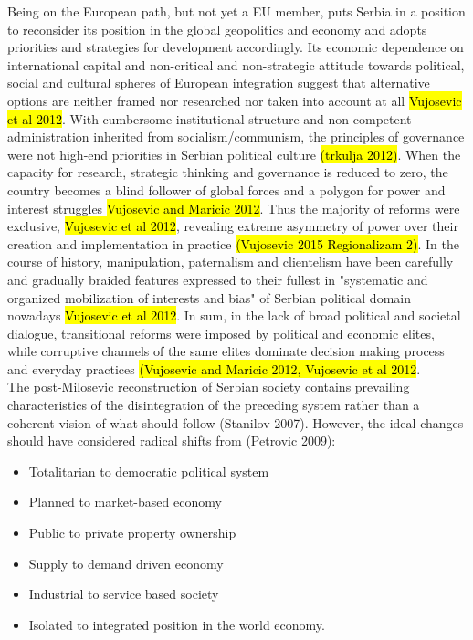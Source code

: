 \documentclass[11pt]{report}
\begin{document}
Being on the European path, but not yet a EU member, puts Serbia in a position to reconsider its position in the global geopolitics and economy and adopts priorities and strategies for development accordingly. Its economic dependence on international capital and non-critical and non-strategic attitude towards political, social and cultural spheres of European integration suggest that alternative options are neither framed nor researched nor taken into account at all \hl{Vujosevic et al 2012}. With cumbersome institutional structure and non-competent administration inherited from socialism/communism, the principles of governance were not high-end priorities in Serbian political culture \hl{(trkulja 2012)}. When the capacity for research, strategic thinking and governance is reduced to zero, the country becomes a blind follower of global forces and a polygon for power and interest struggles \hl{Vujosevic and Maricic 2012}.
Thus the majority of reforms were exclusive, \hl{Vujosevic et al 2012}, revealing extreme asymmetry of power over their creation and implementation in practice \hl{(Vujosevic 2015 Regionalizam 2)}.
In the course of history, manipulation, paternalism and clientelism have been carefully and gradually braided features expressed to their fullest in  "systematic and organized mobilization of interests and bias" of Serbian political domain nowadays \hl{Vujosevic et al 2012}. In sum, in the lack of broad political and societal dialogue, transitional reforms were imposed by political and economic elites, while corruptive channels of the same elites dominate decision making process and everyday practices \hl{(Vujosevic and Maricic 2012, Vujosevic et al 2012}. 
\\
The post-Milosevic reconstruction of Serbian society contains prevailing characteristics of the disintegration of the preceding system rather than a coherent vision of what should follow (Stanilov 2007). However, the ideal changes should have considered radical shifts from (Petrovic 2009):
\begin{itemize}
\item Totalitarian to democratic political system
\item Planned to market-based economy
\item Public to private property ownership
\item Supply to demand driven economy
\item Industrial to service based society
\item Isolated to integrated position in the world economy.
\end{itemize}
\end{document}
